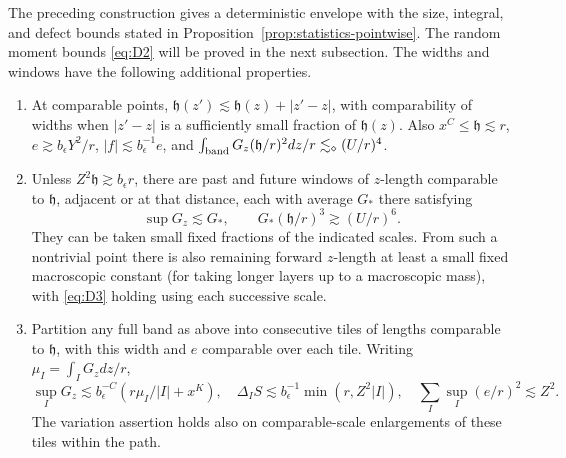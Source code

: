 \begin{lemma}\label{lem:statistics-widths}
The preceding construction gives a deterministic envelope with the
size, integral, and defect bounds stated in
Proposition~\ref{prop:statistics-pointwise}.  The random moment bounds
\eqref{eq:D2} will be proved in the next subsection.  The widths and
windows have the following additional properties.
\begin{enumerate}[label=\textup{(\roman*)},leftmargin=*]
\item At comparable points, \(\mathfrak h(z')\lesssim\mathfrak h(z)+|z'-z|\), with comparability of widths when \(|z'-z|\) is a sufficiently small fraction of \(\mathfrak h(z)\). Also \(x^C\le\mathfrak h\lesssim r\), \(e\gtrsim b_\epsilon Y^2/r\), \(|f|\lesssim b_\epsilon^{-1}e\), and \(\int_{\rm band}G_z(\mathfrak h/r)^2 dz/r\lesssim_\diamond(U/r)^4\).
\item Unless \(Z^2\mathfrak h\gtrsim b_\epsilon r\), there are past and future windows of \(z\)-length comparable to \(\mathfrak h\), adjacent or at that distance, each with average \(G_*\) there satisfying
\begin{equation}
\sup G_z\lesssim G_*,\qquad G_*(\mathfrak h/r)^3\gtrsim (U/r)^6 .          \tag{D4}\label{eq:D4}
\end{equation}
They can be taken small fixed fractions of the indicated scales. From such a nontrivial point there is also remaining forward \(z\)-length at least a small fixed macroscopic constant (for taking longer layers up to a macroscopic mass), with \eqref{eq:D3} holding using each successive scale.
\item Partition any full band as above into consecutive tiles of lengths comparable to \(\mathfrak h\), with this width and \(e\) comparable over each tile. Writing \(\mu_I=\int_I G_z dz/r\),
\begin{equation}
\sup_I G_z\lesssim b_\epsilon^{-C}(r\mu_I/|I|+x^K),\quad
 \Delta_I S\lesssim b_\epsilon^{-1}\min(r,Z^2 |I|),\quad
 \sum_I \sup_I(e/r)^2\lesssim Z^2 .                                 \tag{D5}\label{eq:D5}
\end{equation}
The variation assertion holds also on comparable-scale enlargements of these tiles within the path.

\end{enumerate}
\end{lemma}

